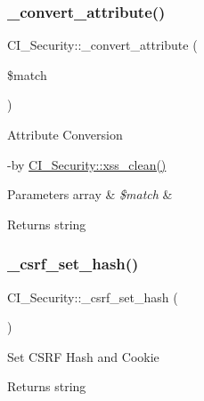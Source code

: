 \subsubsection{\texorpdfstring{\+\_\+convert\+\_\+attribute()}{\_convert\_attribute()}}
{\footnotesize\ttfamily C\+I\+\_\+\+Security\+::\+\_\+convert\+\_\+attribute (\begin{DoxyParamCaption}\item[{}]{\$match }\end{DoxyParamCaption})\hspace{0.3cm}{\ttfamily [protected]}}

Attribute Conversion

-\/by \mbox{\hyperlink{class_c_i___security_a2a5bb2a641bd37cbae73a96ee35dee30}{C\+I\+\_\+\+Security\+::xss\+\_\+clean()}} 
\begin{DoxyParams}[1]{Parameters}
array & {\em \$match} & \\
\hline
\end{DoxyParams}
\begin{DoxyReturn}{Returns}
string 
\end{DoxyReturn}
\mbox{\label{class_c_i___security_a77327709ac2d3f176431a391bf27e2af}} 
\subsubsection{\texorpdfstring{\+\_\+csrf\+\_\+set\+\_\+hash()}{\_csrf\_set\_hash()}}
{\footnotesize\ttfamily C\+I\+\_\+\+Security\+::\+\_\+csrf\+\_\+set\+\_\+hash (\begin{DoxyParamCaption}{ }\end{DoxyParamCaption})\hspace{0.3cm}{\ttfamily [protected]}}

Set C\+S\+RF Hash and Cookie

\begin{DoxyReturn}{Returns}
string 
\end{DoxyReturn}
\mbox{\label{class_c_i___security_a9e9024c0f3ed639e5095f2aa33698db5}} 
